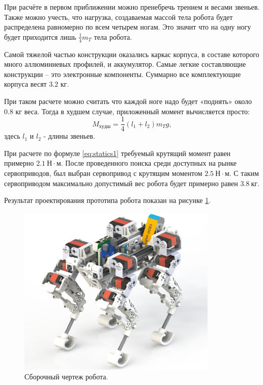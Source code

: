 При расчёте в первом приближении можно пренебречь трением и весами звеньев. Также можно учесть, что нагрузка, создаваемая массой тела робота будет распределена равномерно по всем четырем ногам. Это значит что на одну ногу будет приходится лишь $\frac{1}{4}m_T$ тела робота.

Самой тяжелой частью конструкции оказались каркас корпуса, в составе которого много аллюминиевых профилей, и аккумулятор. Самые легкие составляющие конструкции -- это электронные компоненты. Суммарно все комплектующие корпуса весят $3.2$ кг. 

При таком расчете можно считать что каждой ноге надо будет «поднять» около $ 0.8 $ кг веса. Тогда в худшем случае, приложенный момент вычисляется просто:
\begin{equation} \label{eq:statics1}
    M_{худш}= \frac 1 4 (l_{1}+l_{2}) m_T g, 
\end{equation}
\noindent здесь $l_1$ и $l_2$ - длины звеньев.

При расчете по формуле \ref{eq:statics1} требуемый крутящий момент равен примерно $ 2.1  \: Н \cdot м$. После проведенного поиска среди доступных на рынке сервоприводов, был выбран сервопривод с крутящим моментом $ 2.5 \: Н \cdot м $. С таким сервоприводом максимально допустимый вес робота будет примерно равен $ 3.8 \: кг $.

Результат проектирования прототипа робота показан на рисунке \ref{fig:final_render}.

\begin{figure}[h]
    \centering
    \includegraphics[width=0.85\textwidth]{chapter_mechanics_construction/figure20.png}
    \caption{Сборочный чертеж робота.}
    \label{fig:final_render}
\end{figure}

